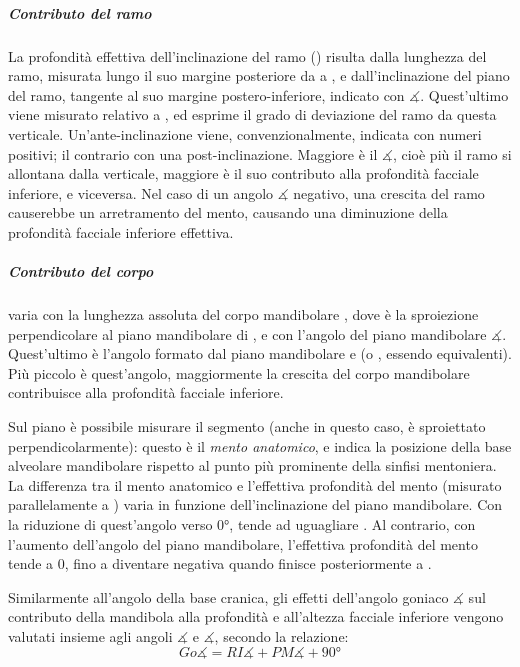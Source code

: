 \subparagraph{Contributo del ramo} La profondità effettiva dell'inclinazione del ramo () risulta dalla lunghezza del ramo, misurata lungo il suo margine posteriore da  a , e dall'inclinazione del piano del ramo, tangente al suo margine postero-inferiore, indicato con $\measuredangle$. Quest'ultimo viene misurato relativo a , ed esprime il grado di deviazione del ramo da questa verticale. Un'ante-inclinazione viene, convenzionalmente, indicata con numeri positivi; il contrario con una post-inclinazione. Maggiore è il $\measuredangle$, cioè più il ramo si allontana dalla verticale, maggiore è il suo contributo alla profondità facciale inferiore, e viceversa. Nel caso di un angolo $\measuredangle$ negativo, una crescita del ramo causerebbe un arretramento del mento, causando una diminuzione della profondità facciale inferiore effettiva.

\subparagraph{Contributo del corpo}  varia con la lunghezza assoluta del corpo mandibolare , dove  è la sproiezione perpendicolare al piano mandibolare di , e con l'angolo del piano mandibolare $\measuredangle$. Quest'ultimo è l'angolo formato dal piano mandibolare e  (o , essendo equivalenti). Più piccolo è quest'angolo, maggiormente la crescita del corpo mandibolare contribuisce alla profondità facciale inferiore.

Sul piano  è possibile misurare il segmento  (anche in questo caso,  è sproiettato perpendicolarmente): questo è il \emph{mento anatomico}, e indica la posizione della base alveolare mandibolare rispetto al punto più prominente della sinfisi mentoniera. La differenza tra il mento anatomico e l'effettiva profondità del mento  (misurato parallelamente a ) varia in funzione dell'inclinazione del piano mandibolare. Con la riduzione di quest'angolo verso $0°$,  tende ad uguagliare . Al contrario, con l'aumento dell'angolo del piano mandibolare, l'effettiva profondità del mento tende a 0, fino a diventare negativa quando  finisce posteriormente a .

Similarmente all'angolo della base cranica, gli effetti dell'angolo goniaco $\measuredangle$ sul contributo della mandibola alla profondità e all'altezza facciale inferiore vengono valutati insieme agli angoli $\measuredangle$ e $\measuredangle$, secondo la relazione:
\begin{equation}
Go\measuredangle = RI\measuredangle + PM\measuredangle + 90°
\end{equation}

